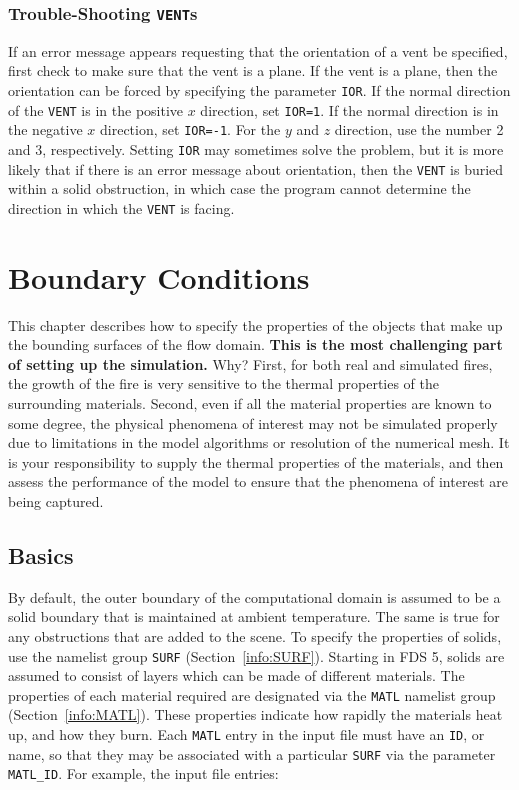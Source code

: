 \documentclass[11pt]{book}
\newcommand{\ct}{\tt\small}
\begin{document}
\subsection{Trouble-Shooting {\tt VENT}s}

If an error message appears requesting that 
the orientation of a vent be specified, first check to make sure that the vent is a plane.
If the vent is a plane, then the orientation can be forced by specifying the parameter {\ct IOR}.
If the normal direction of the {\ct VENT} is in the positive $x$ direction, set {\ct IOR=1}.
If the normal direction is in the negative $x$ direction, set {\ct IOR=-1}. For the $y$ and
$z$ direction, use the number 2 and 3, respectively. Setting {\ct IOR} may sometimes solve
the problem, but it is more likely that if there is an error message about orientation, then
the {\ct VENT} is buried within a solid obstruction, in which case the program cannot determine
the direction in which the {\ct VENT} is facing.










\chapter{Boundary Conditions}

This chapter describes how to specify the properties of the objects
that make up the bounding surfaces of the flow domain. {\bf This is
the most challenging part of setting up the simulation.} Why?  First,
for both real and simulated fires, the growth of the fire is very
sensitive to the thermal properties of the surrounding
materials. Second, even if all the material properties are known to
some degree, the physical phenomena of interest may not be simulated
properly due to limitations in the model algorithms or resolution of
the numerical mesh. It is your responsibility to supply the thermal
properties of the materials, and then assess the performance of the
model to ensure that the phenomena of interest are being captured.


\section{Basics}

By default, the outer boundary of the computational domain is assumed
to be a solid boundary that is maintained at ambient temperature. The
same is true for any obstructions that are added to the scene. To
specify the properties of solids, use the namelist group {\ct SURF}
(Section~\ref{info:SURF}). Starting in FDS 5, solids are assumed to
consist of layers which can be made of different materials.  The
properties of each material required are designated via the {\ct MATL}
namelist group (Section~\ref{info:MATL}).  These properties indicate how
rapidly the materials heat up, and how they burn.  Each {\ct MATL}
entry in the input file must have an {\ct ID}, or name, so that they
may be associated with a particular {\ct SURF} via the parameter {\ct
MATL\_ID}.  For example, the input file entries:
\end{document}
